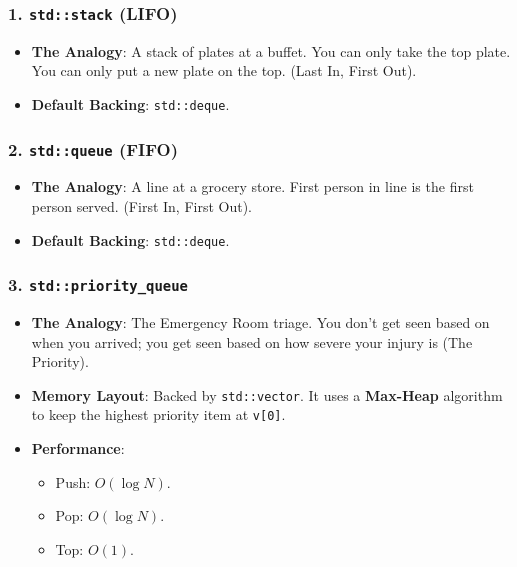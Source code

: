 \hypertarget{stdstack-lifo}{%
\subsubsection{\texorpdfstring{1. \texttt{std::stack}
(LIFO)}{1. std::stack (LIFO)}}\label{stdstack-lifo}}

\begin{itemize}
\tightlist
\item
  \textbf{The Analogy}: A stack of plates at a buffet. You can only take
  the top plate. You can only put a new plate on the top. (Last In,
  First Out).
\item
  \textbf{Default Backing}: \passthrough{\lstinline!std::deque!}.
\end{itemize}

\hypertarget{stdqueue-fifo}{%
\subsubsection{\texorpdfstring{2. \texttt{std::queue}
(FIFO)}{2. std::queue (FIFO)}}\label{stdqueue-fifo}}

\begin{itemize}
\tightlist
\item
  \textbf{The Analogy}: A line at a grocery store. First person in line
  is the first person served. (First In, First Out).
\item
  \textbf{Default Backing}: \passthrough{\lstinline!std::deque!}.
\end{itemize}

\hypertarget{stdpriority_queue}{%
\subsubsection{\texorpdfstring{3.
\texttt{std::priority\_queue}}{3. std::priority\_queue}}\label{stdpriority_queue}}

\begin{itemize}
\tightlist
\item
  \textbf{The Analogy}: The Emergency Room triage. You don't get seen
  based on when you arrived; you get seen based on how severe your
  injury is (The Priority).
\item
  \textbf{Memory Layout}: Backed by
  \passthrough{\lstinline!std::vector!}. It uses a \textbf{Max-Heap}
  algorithm to keep the highest priority item at
  \passthrough{\lstinline!v[0]!}.
\item
  \textbf{Performance}:

  \begin{itemize}
  \tightlist
  \item
    Push: \(O(\log N)\).
  \item
    Pop: \(O(\log N)\).
  \item
    Top: \(O(1)\).
  \end{itemize}
\end{itemize}

